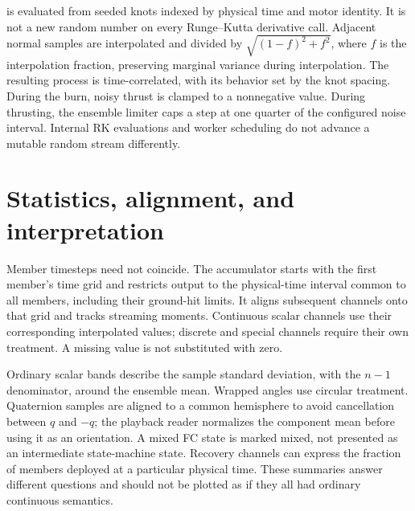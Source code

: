 is evaluated from seeded knots indexed by physical time and motor identity. It is not a new random number on every Runge--Kutta derivative call. Adjacent normal samples are interpolated and divided by $\sqrt{(1-f)^2+f^2}$, where $f$ is the interpolation fraction, preserving marginal variance during interpolation. The resulting process is time-correlated, with its behavior set by the knot spacing. During the burn, noisy thrust is clamped to a nonnegative value. During thrusting, the ensemble limiter caps a step at one quarter of the configured noise interval. Internal RK evaluations and worker scheduling do not advance a mutable random stream differently.


\section{Statistics, alignment, and interpretation}
Member timesteps need not coincide. The accumulator starts with the first member's time grid and restricts output to the physical-time interval common to all members, including their ground-hit limits. It aligns subsequent channels onto that grid and tracks streaming moments. Continuous scalar channels use their corresponding interpolated values; discrete and special channels require their own treatment. A missing value is not substituted with zero.

Ordinary scalar bands describe the sample standard deviation, with the $n-1$ denominator, around the ensemble mean. Wrapped angles use circular treatment. Quaternion samples are aligned to a common hemisphere to avoid cancellation between $q$ and $-q$; the playback reader normalizes the component mean before using it as an orientation. A mixed FC state is marked mixed, not presented as an intermediate state-machine state. Recovery channels can express the fraction of members deployed at a particular physical time. These summaries answer different questions and should not be plotted as if they all had ordinary continuous semantics.


